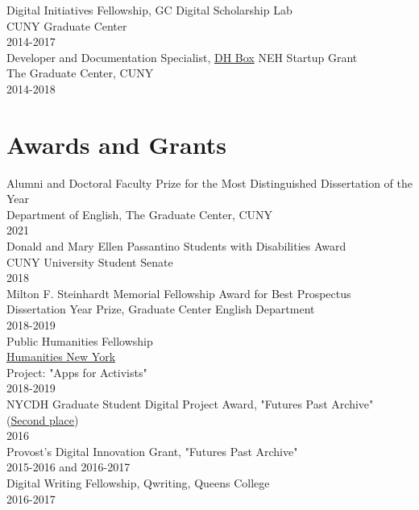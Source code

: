 \documentclass[11pt]{article}
\begin{document}
Digital Initiatives Fellowship, GC Digital Scholarship Lab\\
CUNY Graduate Center\\
2014-2017\\

Developer and Documentation Specialist, \href{https://dhbox.org/}{DH Box} NEH Startup Grant\\
The Graduate Center, CUNY\\
2014-2018\\

\section*{Awards and Grants}
\label{sec:orgheadline3}
Alumni and Doctoral Faculty Prize for the Most Distinguished Dissertation of the Year\\
Department of English, The Graduate Center, CUNY\\
2021\\

Donald and Mary Ellen Passantino Students with Disabilities Award\\
CUNY University Student Senate\\
2018\\

Milton F. Steinhardt Memorial Fellowship Award for Best Prospectus\\
Dissertation Year Prize, Graduate Center English Department\\
2018-2019\\

Public Humanities Fellowship\\
\href{https://humanitiesny.org/}{Humanities New York}\\
Project: "Apps for Activists"\\
2018-2019\\

NYCDH Graduate Student Digital Project Award, "Futures Past Archive" (\href{http://nycdh.org/nycdh-graduate-student-digital-project-awards-2016/}{Second place})\\
2016\\

Provost's Digital Innovation Grant, "Futures Past Archive"\\
2015-2016 and 2016-2017\\

Digital Writing Fellowship, Qwriting, Queens College\\
2016-2017\\
\end{document}

